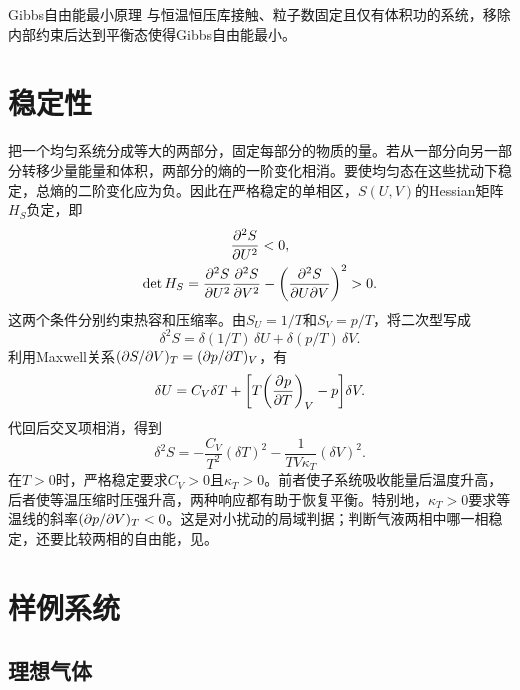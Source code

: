 \begin{theorem}
	{Gibbs自由能最小原理}{}
	与恒温恒压库接触、粒子数固定且仅有体积功的系统，移除内部约束后达到平衡态使得Gibbs自由能最小。
\end{theorem}

\section{稳定性}
\label{sec:thermo-stability}

把一个均匀系统分成等大的两部分，固定每部分的物质的量。若从一部分向另一部分转移少量能量和体积，两部分的熵的一阶变化相消。要使均匀态在这些扰动下稳定，总熵的二阶变化应为负。因此在严格稳定的单相区，$S(U,V)$的Hessian矩阵$H_S$负定，即
\begin{subequations}
	\begin{gather}
		\pv[2]SU < 0,\\
		\det H_S = \pv[2]SU\pv[2]SV - \biggp{\pw SUV}^2 > 0.
	\end{gather}
\end{subequations}
这两个条件分别约束热容和压缩率。由$S_U = 1/T$和$S_V = p/T$，将二次型写成
\[
	\delta^2 S = \delta(1/T)\,\delta U + \delta(p/T)\,\delta V.
\]
利用Maxwell关系$(\p S/\p V)_T = (\p p/\p T)_V$，有
\[
	\delta U = C_V\delta T + \biggb{T\pvat{p}{T}{V} - p}\delta V.
\]
代回后交叉项相消，得到
\begin{equation}
	\delta^2 S = -\frac{C_V}{T^2}(\delta T)^2 - \frac{1}{TV\kappa_T}(\delta V)^2.
\end{equation}
在$T > 0$时，严格稳定要求$C_V > 0$且$\kappa_T > 0$。前者使子系统吸收能量后温度升高，后者使等温压缩时压强升高，两种响应都有助于恢复平衡。特别地，$\kappa_T > 0$要求等温线的斜率$(\p p/\p V)_T < 0$。这是对小扰动的局域判据；判断气液两相中哪一相稳定，还要比较两相的自由能，见。

\section{样例系统}

\subsection{理想气体}

